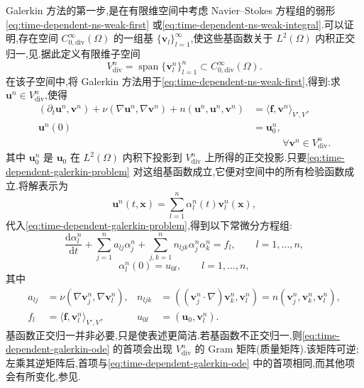 \begin{note}\label{note:time-dependent-galerkin-start}
Galerkin 方法的第一步,是在有限维空间中考虑 Navier--Stokes 方程组的弱形\cref{eq:time-dependent-ns-weak-first} 或\cref{eq:time-dependent-ns-weak-integral}.可以证明,存在空间 $C_{0,\mathrm{div}}^\infty(\Omega)$ 的一组基 $\{\bm{v}_l\}_{l=1}^\infty$,使这些基函数关于 $L^2(\Omega)$ 内积正交归一,见\textcite[引理 2.3]{Galdi2000}.据此定义有限维子空间
\[
  V_{\mathrm{div}}^n
    =\operatorname{span}\{\bm{v}_l^n\}_{l=1}^n
    \subset C_{0,\mathrm{div}}^\infty(\Omega).
\]
在该子空间中,将 Galerkin 方法用于\cref{eq:time-dependent-ns-weak-first},得到:求 $\bm{u}^n\in V_{\mathrm{div}}^n$,使得
\begin{equation}\label{eq:time-dependent-galerkin-problem}
\begin{aligned}
  (\partial_t\bm{u}^n,\bm{v}^n)
    +\nu(\nabla\bm{u}^n,\nabla\bm{v}^n)
    +n(\bm{u}^n,\bm{u}^n,\bm{v}^n)
    &=\langle\bm{f},\bm{v}^n\rangle_{V',V},\\
  \bm{u}^n(0)&=\bm{u}_0^n,\\
  &\hspace{3em}\forall\bm{v}^n\in V_{\mathrm{div}}^n.
\end{aligned}
\end{equation}
其中 $\bm{u}_0^n$ 是 $\bm{u}_0$ 在 $L^2(\Omega)$ 内积下投影到 $V_{\mathrm{div}}^n$ 上所得的正交投影.只要\cref{eq:time-dependent-galerkin-problem} 对这组基函数成立,它便对空间中的所有检验函数成立.将解表示为
\begin{equation}\label{eq:time-dependent-galerkin-expansion}
  \bm{u}^n(t,\bm{x})
    =\sum_{l=1}^n\alpha_l^n(t)\bm{v}_l^n(\bm{x}),
\end{equation}
代入\cref{eq:time-dependent-galerkin-problem},得到以下常微分方程组:
\begin{equation}\label{eq:time-dependent-galerkin-ode}
  \frac{\mathrm{d}\alpha_l^n}{\mathrm{d}t}
    +\sum_{j=1}^n a_{lj}\alpha_j^n
    +\sum_{j,k=1}^n n_{ljk}\alpha_j^n\alpha_k^n
    =f_l,\qquad l=1,\ldots,n,
\end{equation}
\begin{equation}\label{eq:time-dependent-galerkin-initial}
  \alpha_l^n(0)=u_{0l},\qquad l=1,\ldots,n,
\end{equation}
其中
\[
\begin{aligned}
  a_{lj}&=\nu(\nabla\bm{v}_j^n,\nabla\bm{v}_l^n),
  &n_{ljk}&=((\bm{v}_j^n\cdot\nabla)\bm{v}_k^n,\bm{v}_l^n)
            =n(\bm{v}_j^n,\bm{v}_k^n,\bm{v}_l^n),\\
  f_l&=\langle\bm{f},\bm{v}_l^n\rangle_{V',V},
  &u_{0l}&=(\bm{u}_0,\bm{v}_l^n).
\end{aligned}
\]
基函数正交归一并非必要,只是使表述更简洁.若基函数不正交归一,则\cref{eq:time-dependent-galerkin-ode} 的首项会出现 $V_{\mathrm{div}}^n$ 的 Gram 矩阵(质量矩阵).该矩阵可逆;左乘其逆矩阵后,首项与\cref{eq:time-dependent-galerkin-ode} 中的首项相同,而其他项会有所变化,参见\textcite[第 283 页]{Temam1984}.
\end{note}

